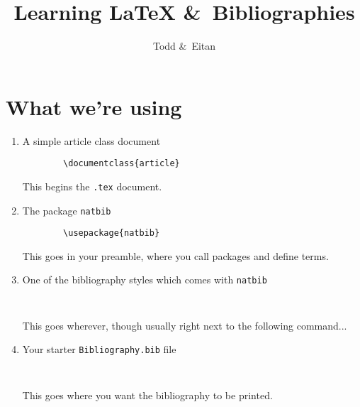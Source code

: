 \documentclass{article}
\author{Todd \&~Eitan}
\title{Learning \LaTeX{} \&~Bibliographies}
\begin{document}
\maketitle

\section*{What we're using}
\begin{enumerate}
    \item A simple article class document
        \begin{lstlisting}
        \documentclass{article}
        \end{lstlisting}
    This begins the \texttt{.tex} document.
    \item The package \texttt{natbib}
        \begin{lstlisting}
        \usepackage{natbib}
        \end{lstlisting}
    This goes in your preamble, where you call packages and define terms.
    \item One of the bibliography styles which comes with \texttt{natbib}
        \begin{lstlisting}
        
        \end{lstlisting}
    This goes wherever, though usually right next to the following command...
    \item Your starter \texttt{Bibliography.bib} file
        \begin{lstlisting}
        
        \end{lstlisting}
    This goes where you want the bibliography to be printed.
\end{enumerate}
\end{document}

